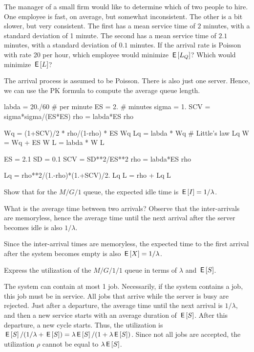 \begin{exercise}[Hall 5.16] 
The manager of a small firm would like to determine which of two people to hire.
 One employee is fast, on average, but somewhat inconsistent.
 The other is a bit slower, but very consistent.
 The first has a mean service time of $2$ minutes, with a standard deviation of 1 minute.
 The second has a mean service time of $2.1$ minutes, with a standard deviation of $0.1$ minutes.
 If the arrival rate is Poisson with rate 20 per hour, which employee would minimize $\,\mathsf{E}\left[L_Q\right]$?
 Which would minimize $\,\mathsf{E}\left[L\right]$?
\begin{solution}
 The arrival process is assumed to be Poisson. There is also
 just one server. Hence, we can use the PK formula to compute the average queue length.

\begin{pyconsole}
labda = 20./60 # per minute
ES = 2. # minutes
sigma = 1.
SCV = sigma*sigma/(ES*ES)
rho = labda*ES
rho

Wq = (1+SCV)/2 * rho/(1-rho) * ES
Wq
Lq = labda * Wq # Little's law
Lq
W = Wq + ES
W
L = labda * W
L
\end{pyconsole}


\begin{pyconsole}
ES = 2.1
SD = 0.1
SCV = SD**2/ES**2
rho = labda*ES
rho

Lq = rho**2/(1.-rho)*(1.+SCV)/2.
Lq
L = rho + Lq
L
\end{pyconsole}

\end{solution}
\end{exercise}


\begin{extra}
 Show that for the $M/G/1$ queue, the expected idle time is
 $\,\mathsf{E}\left[I\right] = 1/\lambda$. 
\begin{hint}
What is the average time between two
 arrivals? Observe that the inter-arrivals are memoryless, hence the
 average time until the next arrival after the server becomes idle
 is also $1/\lambda$.
\end{hint}
\begin{solution}
 Since the inter-arrival times are memoryless, the expected time to the first arrival after the system becomes empty is also $\,\mathsf{E}\left[X\right]=1/\lambda$.
\end{solution}
\end{extra}

\begin{extra}
 Express the utilization of the $M/G/1/1$ queue in terms of $\lambda$ and $\,\mathsf{E}\left[S\right]$.
\begin{solution}
 The system can contain at most 1 job.
 Necessarily, if the system contains a job, this job must be in service.
 All jobs that arrive while the server is busy are rejected.
 Just after a departure, the average time until the next arrival is $1/\lambda$, and then a new service starts with an average duration of $\,\mathsf{E}\left[S\right]$.
 After this departure, a new cycle starts.
 Thus, the utilization is $\,\mathsf{E}\left[S\right]/(1/\lambda + \,\mathsf{E}\left[S\right]) = \lambda \,\mathsf{E}\left[S\right]/ (1 + \lambda \,\mathsf{E}\left[S\right])$.
 Since not all jobs are accepted, the utilization $\rho$ cannot be equal to $\lambda \,\mathsf{E}\left[S\right]$.
\end{solution}
\end{extra}

